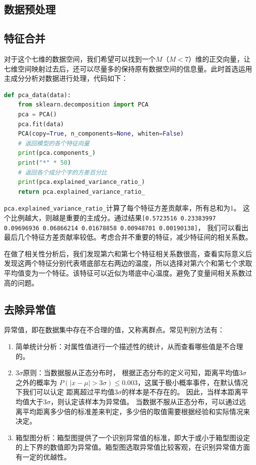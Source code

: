 \documentclass[11pt,a4paper]{elegantpaper}
\begin{document}
\begin{multicols}{2}
\section{数据预处理}

\subsection{特征合并}

对于这个七维的数据空间，我们希望可以找到一个$M$（$M < 7$）维的正交向量，让七维空间映射过去后，还可以尽量多的保持原有数据空间的信息量。此时首选运用主成分分析对数据进行处理，代码如下：

\begin{lstlisting}[language=Python]
def pca_data(data):
    from sklearn.decomposition import PCA
    pca = PCA()
    pca.fit(data)
    PCA(copy=True, n_components=None, whiten=False)
    # 返回模型的各个特征向量
    print(pca.components_)  
    print("*" * 50)
    # 返回各个成分个字的方差百分比
    print(pca.explained_variance_ratio_)  
    return pca.explained_variance_ratio_
\end{lstlisting}

\lstinline{pca.explained_variance_ratio_}计算了每个特征方差贡献率，所有总和为1。
这个比例越大，则越是重要的主成分。通过结果\lstinline{[0.5723516 0.23383997 0.09696936 0.06866214 0.01678858 0.00948701 0.00190138]}，
我们可以看出最后几个特征方差贡献率较低。考虑合并不重要的特征，减少特征间的相关系数。

在做了相关性分析后，我们发现第六和第七个特征相关系数很高，查看实际意义后发现这两个特征分别代表塔底部左右两边的温度，所以选择对第六个和第七个求取平均值变为一个特征。该特征可以近似为塔底中心温度。避免了变量间相关系数过高的问题。


\subsection{去除异常值}

异常值，即在数据集中存在不合理的值，又称离群点。常见判别方法有：

\begin{enumerate}
  \item 简单统计分析：对属性值进行一个描述性的统计，从而查看哪些值是不合理的。
  \item $3\sigma$原则：当数据服从正态分布时，
  根据正态分布的定义可知，距离平均值$3\sigma$之外的概率为 $P(|x-\mu|>3\sigma) \leqslant 0.003$，这属于极小概率事件，在默认情况下我们可以认定
  距离超过平均值$3\sigma$的样本是不存在的。 因此，当样本距离平均值大于$3\sigma$，则认定该样本为异常值。
  当数据不服从正态分布，可以通过远离平均距离多少倍的标准差来判定，多少倍的取值需要根据经验和实际情况来决定。
  \item 箱型图分析：箱型图提供了一个识别异常值的标准，即大于或小于箱型图设定的上下界的数值即为异常值。箱型图选取异常值比较客观，在识别异常值方面有一定的优越性。
\end{enumerate}


\end{multicols}
\end{document}
